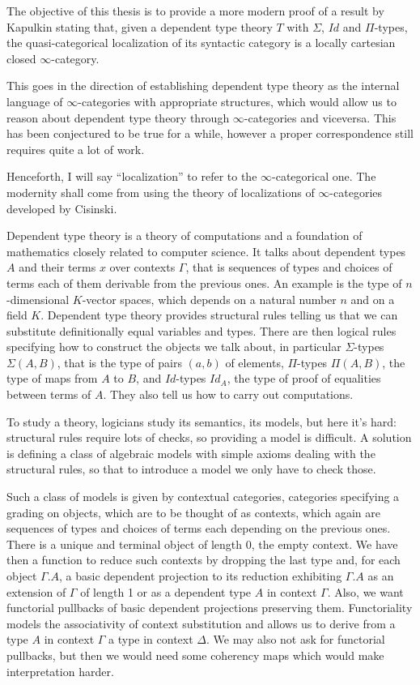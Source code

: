 \documentclass{minimal}
\newcommand{\Id}{Id}
\begin{document}
The objective of this thesis is to provide a more modern proof of a result by
Kapulkin stating that, given a dependent type theory $T$ with $\Sigma$, $\Id$
and $\Pi$-types, the quasi-categorical localization of its syntactic category is
a locally cartesian closed $\infty$-category. 

This goes in the direction of establishing dependent type theory as the internal
language of $\infty$-categories with appropriate structures, which would allow
us to reason about dependent
type theory through $\infty$-categories and viceversa. This has been conjectured
to be true for a while, however a proper correspondence still requires quite a
lot of work.

Henceforth, I will say ``localization'' to refer to the $\infty$-categorical one.
The modernity shall come
from using the theory of localizations of $\infty$-categories developed by
Cisinski.

Dependent type theory is a theory of computations and a foundation of
mathematics closely related to computer science.
It talks about dependent types $A$ and their terms $x$ over contexts $\Gamma$,
that is sequences of types and choices of terms each of them derivable from the
previous ones. An example is the type of $n$-dimensional $K$-vector spaces,
which depends on a natural number $n$ and on a field $K$.
Dependent type theory provides structural rules telling us that we can
substitute definitionally equal variables and types. There are then logical
rules specifying how to construct the objects we talk about, in particular
$\Sigma$-types $\Sigma(A,B)$, that is the type of pairs $(a,b)$ of elements,
$\Pi$-types $\Pi(A,B)$, the type of maps from $A$ to $B$, and $\Id$-types
$\Id_A$, the type of proof of equalities between terms of $A$. They also tell us
how to carry out computations.

To study a theory, logicians study its semantics, its models, but here it's hard:
structural rules require lots of checks, so providing a model is difficult. A
solution is defining a class of algebraic models with simple axioms dealing with
the structural rules, so that to
introduce a model we only have to check those.

Such a class of models is given by contextual categories, categories specifying
a grading on objects, which are to be thought of as contexts, which again are
sequences of types and choices of terms each depending on the previous ones.
There is a unique and terminal object of length 0, the empty context. We
have then a function to reduce such contexts by dropping the last type and, for
each object $\Gamma.A$, a basic dependent projection to its reduction exhibiting
$\Gamma.A$ as an extension of $\Gamma$ of length 1 or as a dependent type $A$ in
context $\Gamma$. Also, we want
functorial pullbacks of basic dependent projections preserving them.
Functoriality models the associativity of context substitution and allows us
to derive from a type $A$ in context $\Gamma$ a type in context $\Delta$. We may
also not ask for functorial pullbacks, but then we would need some coherency
maps which would make interpretation harder.
\end{document}
